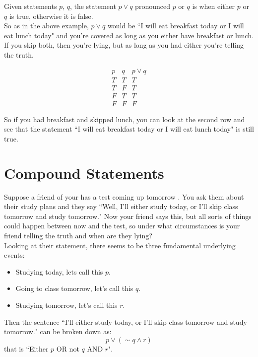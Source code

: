 Given statements $p$, $q$, the statement $p\vee q$ pronounced $p$ or $q$ is when either $p$ or $q$ is true, otherwise it is false.\\

So as in the above example, $p\vee q$ would be ``I will eat breakfast today or I will eat lunch today" and you're covered as long as you either have breakfast or lunch.  If you skip both, then you're lying, but as long as you had either you're telling the truth.

$$\begin{array}{c|c|c}
p&q&p\vee q\\
\hline
T & T&T\\
T&F&T\\
F&T&T\\
F&F&F
\end{array}$$

So if you had breakfast and skipped lunch, you can look at the second row and see that the statement ``I will eat breakfast today or I will eat lunch today" is still true.


\section{Compound Statements}\label{Section:CompoundStatements}

Suppose a friend of your has a test coming up tomorrow .  You ask them about their study plans and they say ``Well, I'll either study today, or I'll skip class tomorrow and study tomorrow."  Now your friend says this, but all sorts of things could happen between now and the test, so under what circumstances is your friend telling the truth and when are they lying?\\

Looking at their statement, there seems to be three fundamental underlying events:

\begin{itemize}
\item Studying today, lets call this $p$.
\item Going to class tomorrow, let's call this $q$.
\item Studying tomorrow, let's call this $r$.
\end{itemize}

Then the sentence ``I'll either study today, or I'll skip class tomorrow and study tomorrow." can be broken down as: $$p\vee (\sim q \wedge r)$$ that is ``Either $p$ OR not $q$ AND $r$".  \\

